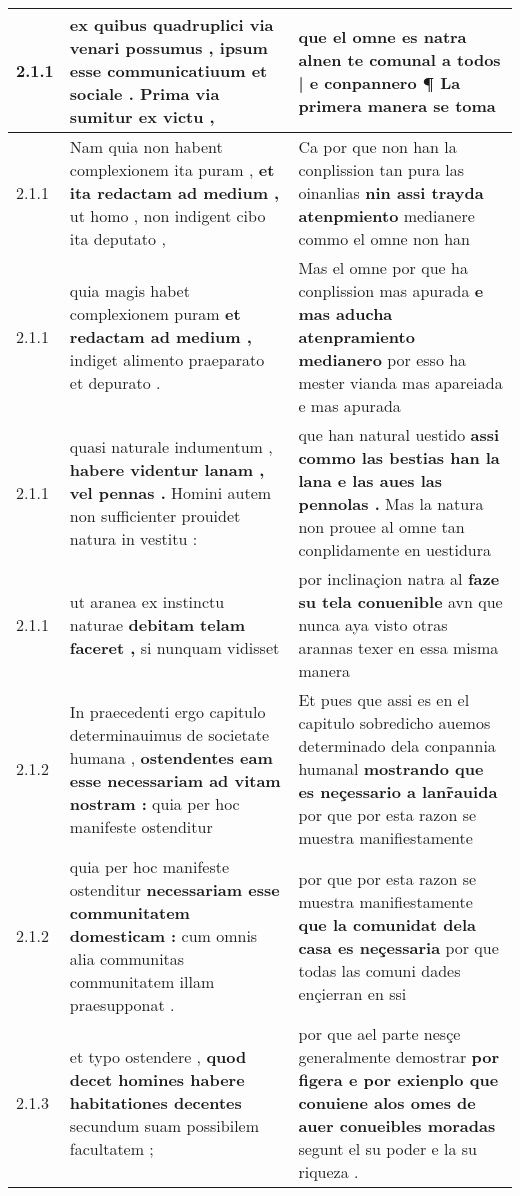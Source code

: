 \begin{tabular}{|p{1cm}|p{6.5cm}|p{6.5cm}|}
2.1.1 & ex quibus quadruplici via venari possumus , \textbf{ ipsum esse communicatiuum et sociale . } Prima via sumitur ex victu , & que el omne es natra \textbf{ alnen te comunal a todos | e conpannero ¶ } La primera manera se toma \\\hline
2.1.1 & Nam quia non habent complexionem ita puram , \textbf{ et ita redactam ad medium , } ut homo , non indigent cibo ita deputato , & Ca por que non han la conplission tan pura las oinanlias \textbf{ nin assi trayda atenpmiento } medianere commo el omne non han \\\hline
2.1.1 & quia magis habet complexionem puram \textbf{ et redactam ad medium , } indiget alimento praeparato et depurato . & Mas el omne por que ha conplission mas apurada \textbf{ e mas aducha atenpramiento medianero } por esso ha mester vianda mas apareiada e mas apurada \\\hline
2.1.1 & quasi naturale indumentum , \textbf{ habere videntur lanam , vel pennas . } Homini autem non sufficienter prouidet natura in vestitu : & que han natural uestido \textbf{ assi commo las bestias han la lana e las aues las pennolas . } Mas la natura non prouee al omne tan conplidamente en uestidura \\\hline
2.1.1 & ut aranea ex instinctu naturae \textbf{ debitam telam faceret , } si nunquam vidisset & por inclinaçion natra al \textbf{ faze su tela conuenible } avn que nunca aya visto otras arannas texer en essa misma manera \\\hline
2.1.2 & In praecedenti ergo capitulo determinauimus de societate humana , \textbf{ ostendentes eam esse necessariam ad vitam nostram : } quia per hoc manifeste ostenditur & Et pues que assi es en el capitulo sobredicho auemos determinado dela conpannia humanal \textbf{ mostrando que es neçessario a lanr̃auida } por que por esta razon se muestra manifiestamente \\\hline
2.1.2 & quia per hoc manifeste ostenditur \textbf{ necessariam esse communitatem domesticam : } cum omnis alia communitas communitatem illam praesupponat . & por que por esta razon se muestra manifiestamente \textbf{ que la comunidat dela casa es neçessaria } por que todas las comuni dades ençierran en ssi \\\hline
2.1.3 & et typo ostendere , \textbf{ quod decet homines habere habitationes decentes } secundum suam possibilem facultatem ; & por que ael parte nesçe generalmente demostrar \textbf{ por figera e por exienplo que conuiene alos omes de auer conueibles moradas } segunt el su poder e la su riqueza . \\\hline

\end{tabular}

